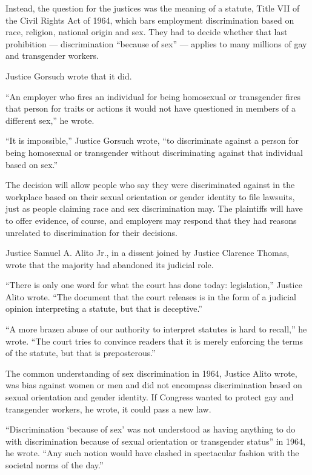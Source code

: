 Instead, the question for the justices was the meaning of a statute,
Title VII of the Civil Rights Act of 1964, which bars employment
discrimination based on race, religion, national origin and sex. They
had to decide whether that last prohibition --- discrimination ``because
of sex'' --- applies to many millions of gay and transgender workers.

Justice Gorsuch wrote that it did.

``An employer who fires an individual for being homosexual or
transgender fires that person for traits or actions it would not have
questioned in members of a different sex,'' he wrote.

``It is impossible,'' Justice Gorsuch wrote, ``to discriminate against a
person for being homosexual or transgender without discriminating
against that individual based on sex.''

The decision will allow people who say they were discriminated against
in the workplace based on their sexual orientation or gender identity to
file lawsuits, just as people claiming race and sex discrimination may.
The plaintiffs will have to offer evidence, of course, and employers may
respond that they had reasons unrelated to discrimination for their
decisions.

Justice Samuel A. Alito Jr., in a dissent joined by Justice Clarence
Thomas, wrote that the majority had abandoned its judicial role.

``There is only one word for what the court has done today:
legislation,'' Justice Alito wrote. ``The document that the court
releases is in the form of a judicial opinion interpreting a statute,
but that is deceptive.''

``A more brazen abuse of our authority to interpret statutes is hard to
recall,'' he wrote. ``The court tries to convince readers that it is
merely enforcing the terms of the statute, but that is preposterous.''

The common understanding of sex discrimination in 1964, Justice Alito
wrote, was bias against women or men and did not encompass
discrimination based on sexual orientation and gender identity. If
Congress wanted to protect gay and transgender workers, he wrote, it
could pass a new law.

``Discrimination `because of sex' was not understood as having anything
to do with discrimination because of sexual orientation or transgender
status'' in 1964, he wrote. ``Any such notion would have clashed in
spectacular fashion with the societal norms of the day.''

